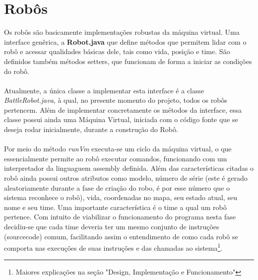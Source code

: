 \documentclass[a4paper]{article}
\begin{document}
\section{Robôs}
Os robôs são basicamente implementações robustas da máquina virtual. Uma interface genêrica, a \textbf{Robot.java} que define métodos que permitem lidar com o robô e acessar qualidades básicas dele, tais como vida, posição e time. São definidos também métodos setters, que funcionam de forma a iniciar as condições do robô.\\\\
Atualmente, a única classe a implementar esta interface é a classe \textit{BattleRobot.java}, à qual, no presente momento do projeto, todos os robôs pertencem. Além de implementar concretamente os métodos da interface, essa classe possui ainda uma Máquina Virtual, iniciada com o código fonte que se deseja rodar inicialmente, durante a construção do Robô.\\\\
Por meio do método \textit{runVm} executa-se um ciclo da máquina virtual, o que essencialmente permite ao robô executar comandos, funcionando com um interpretador da linguaguem assembly definida. Além das características citadas o robô ainda possui outros atributos como modelo, número de série (este é gerado aleatoriamente durante a fase de criação do robo, é por esse número que o sistema reconhece o robô), vida, coordenadas no mapa, seu estado atual, seu nome e seu time. Uma importante característica é o time a qual um robô pertence. Com intuito de viabilizar o funcionamento do programa nesta fase decidiu-se que cada time deveria ter um mesmo conjunto de instruções (sourcecode) comum, facilitando assim o entendimento de como cada robô se comporta nas execuções de suas instruções e das chamadas ao sistema\footnote{Maiores explicações na seção "Design, Implementação e Funcionamento"}.
\end{document}
